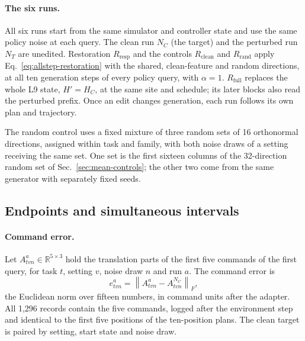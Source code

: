 \paragraph{The six runs.}
All six runs start from the same simulator and controller state and use the same policy noise at each query. The clean run $N_C$ (the target) and the perturbed run $N_T$ are unedited. Restoration $R_{\mathrm{resp}}$ and the controls $R_{\mathrm{clean}}$ and $R_{\mathrm{rand}}$ apply Eq.~\eqref{eq:allstep-restoration} with the shared, clean-feature and random directions, at all ten generation steps of every policy query, with $\alpha=1$. $R_{\mathrm{full}}$ replaces the whole L9 state, $H'=H_C$, at the same site and schedule; its later blocks also read the perturbed prefix. Once an edit changes generation, each run follows its own plan and trajectory.

The random control uses a fixed mixture of three random sets of 16 orthonormal directions, assigned within task and family, with both noise draws of a setting receiving the same set. One set is the first sixteen columns of the 32-direction random set of Sec.~\ref{sec:mean-controls}; the other two come from the same generator with separately fixed seeds.



\subsection{Endpoints and simultaneous intervals}

\paragraph{Command error.}
Let $A_{tvn}^a\in\mathbb R^{5\times3}$ hold the translation parts of the first five commands of the first query, for task $t$, setting $v$, noise draw $n$ and run $a$. The command error is
\begin{equation}
 e_{tvn}^a=\left\|A_{tvn}^a-A_{tvn}^{N_C}\right\|_F,
 \label{eq:allstep-command-error}
\end{equation}
the Euclidean norm over fifteen numbers, in command units after the adapter. All 1,296 records contain the five commands, logged after the environment step and identical to the first five positions of the ten-position plans. The clean target is paired by setting, start state and noise draw.

